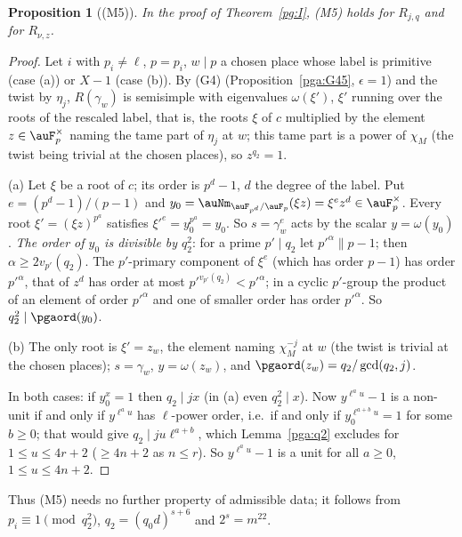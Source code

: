 \documentclass[10pt]{amsart}
\newtheorem{proposition}[theorem]{Proposition}
\theoremstyle{definition}
\theoremstyle{remark}
\begin{document}
\begin{proposition}[(M5)]\label{pga:M5}
In the proof of Theorem~\ref{pg:I}, (M5) holds for $R_{j,q}$ and for $R_{\nu,z}$.
\end{proposition}
\begin{proof}
Let $i$ with $p_i\ne\ell$, $p=p_i$, $w\mid p$ a chosen place whose label is primitive (case (a))
or $X-1$ (case (b)). By (G4) (Proposition~\ref{pga:G45}, $\epsilon=1$) and the twist by $\eta_j$,
$R(\gamma_w)$ is semisimple with eigenvalues $\omega(\xi')$, $\xi'$ running over the roots of the
rescaled label, that is, the roots $\xi$ of $c$ multiplied by the element $z\in\auF_p^\times$
naming the tame part of $\eta_j$ at $w$; this tame part is a power of $\chi_M$ (the twist being
trivial at the chosen places), so $z^{q_2}=1$.

(a) Let $\xi$ be a root of $c$; its order is $p^d-1$, $d$ the degree of the label. Put $e=(p^d-1)/(p-1)$ and $y_0=
\auNm_{\auF_{p^d}/\auF_p}(\xi z)=\xi^ez^d\in\auF_p^\times$. Every root $\xi'=(\xi z)^{p^a}$
satisfies $\xi'^e=y_0^{p^a}=y_0$. So $s=\gamma_w^e$ acts by the scalar $y=\omega(y_0)$. \emph{The
order of $y_0$ is divisible by $q_2^2$}: for a prime $p'\mid q_2$ let $p'^{\alpha}\|p-1$; then
$\alpha\ge2v_{p'}(q_2)$. The $p'$-primary component of $\xi^e$ (which has order $p-1$) has order
$p'^\alpha$, that of $z^d$ has order at most $p'^{v_{p'}(q_2)}<p'^\alpha$; in a cyclic $p'$-group
the product of an element of order $p'^\alpha$ and one of smaller order has order $p'^\alpha$. So
$q_2^2\mid\pgaord(y_0)$.

(b) The only root is $\xi'=z_w$, the element naming $\chi_M^{-j}$ at $w$ (the twist is trivial at
the chosen places); $s=\gamma_w$, $y=\omega(z_w)$, and $\pgaord(z_w)=q_2/\gcd(q_2,j)$.

In both cases: if $y_0^x=1$ then $q_2\mid jx$ (in (a) even $q_2^2\mid x$). Now
$y^{\ell^au}-1$ is a non-unit if and only if $y^{\ell^au}$ has $\ell$-power order, i.e.\ if and only
if $y_0^{\ell^{a+b}u}=1$ for some $b\ge0$; that would give $q_2\mid ju\ell^{a+b}$, which
Lemma~\ref{pga:q2} excludes for $1\le u\le4r+2$ ($\ge4n+2$ as $n\le r$). So $y^{\ell^au}-1$ is a
unit for all $a\ge0$, $1\le u\le4n+2$.
\end{proof}

Thus (M5) needs no further property of admissible data; it follows from $p_i\equiv1\pmod{q_2^2}$, $q_2=(q_0d)^{s+6}$
and $2^s=m^{22}$.
\end{document}
